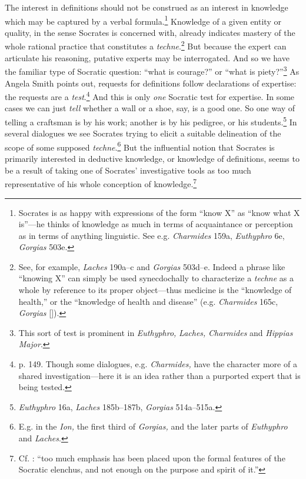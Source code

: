 ﻿\documentclass[11pt]{amsart}
\begin{document}
The interest in definitions should not be construed as an interest in knowledge which may be captured by a verbal formula.\footnote{Socrates is as happy with expressions of the form ``know X'' as ``know what X is''---he thinks of knowledge as much in terms of acquaintance or perception as in terms of anything linguistic. See e.g. \emph{Charmides} 159a, \emph{Euthyphro} 6e, \emph{Gorgias} 503e.} Knowledge of a given entity or quality, in the sense Socrates is concerned with, already indicates mastery of the whole rational practice that constitutes a \emph{techne}.\footnote{See, for example, \emph{Laches} 190a--c and \emph{Gorgias} 503d--e. Indeed a phrase like ``knowing X'' can simply be used synecdochally to characterize a \emph{techne} as a whole by reference to its proper object---thus medicine is the ``knowledge of health,'' or the ``knowledge of health and disease'' (e.g. \emph{Charmides} 165c, \emph{Gorgias} []).} But because the expert can articulate his reasoning, putative experts may be interrogated. And so we have the familiar type of Socratic question: ``what is courage?'' or ``what is piety?''\footnote{This sort of test is prominent in \emph{Euthyphro,} \emph{Laches,} \emph{Charmides} and \emph{Hippias Major}.} As Angela Smith points out, requests for definitions follow declarations of expertise: the requests are a \emph{test}.\footnote{p. 149. Though some dialogues, e.g. \emph{Charmides,} have the character more of a shared investigation---here it is an idea rather than a purported expert that is being tested.} And this is only \emph{one} Socratic test for expertise. In some cases we can just \emph{tell} whether a wall or a shoe, say, is a good one. So one way of telling a craftsman is by his work; another is by his pedigree, or his students.\footnote{\emph{Euthyphro} 16a, \emph{Laches} 185b--187b, \emph{Gorgias} 514a--515a.} In several dialogues we see Socrates trying to elicit a suitable delineation of the scope of some supposed \emph{techne}.\footnote{E.g. in the \emph{Ion,} the first third of \emph{Gorgias,} and the later parts of \emph{Euthyphro} and \emph{Laches}.} But the influential notion that Socrates is primarily interested in deductive knowledge, or knowledge of definitions, seems to be a result of taking one of Socrates' investigative tools as too much representative of his whole conception of knowledge.\footnote{Cf. \citet[153]{asmith1998}: ``too much emphasis has been placed upon the formal features of the Socratic elenchus, and not enough on the purpose and spirit of it.''} 
\end{document}
